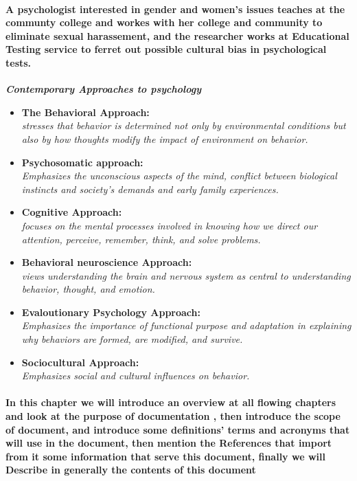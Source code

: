 \documentclass[../Psychological_system_web_application.tex]{subfiles}
\begin{document}
			\paragraph{A \gls{psychologist} interested in gender and women's issues teaches at the communty college and workes with her college and community to eliminate sexual harassement, and the researcher works at Educational Testing service to ferret out possible cultural bias in psychological tests.}
			
			\textsl{\textbf{Contemporary Approaches to \gls{psychology}}}
				\begin{itemize}
					\item
						\textsf{\textbf{\color{red} The Behavioral Approach:}}\\
							\emph{stresses that behavior is determined not only by environmental conditions but also by how thoughts modify the impact of environment on behavior.}
					\item
						\textsf{\textbf{\color{red} Psychosomatic approach:}}\\
							\emph{Emphasizes the unconscious aspects of the mind, conflict between biological instincts and society's demands and early family experiences.}
					\item
						\textsf{\textbf{\color{red} Cognitive Approach:}}\\
							\emph{focuses on the \gls{mental processes} involved in knowing how we direct our attention, perceive, remember, think, and solve problems.}
					\item
						\textsf{\textbf{\color{red}Behavioral neuroscience Approach:}}\\
							\emph{views understanding the brain and nervous system as central to understanding behavior, thought, and emotion.}
					\item
						\textsf{\textbf{\color{red} Evaloutionary Psychology Approach:}}\\
							\emph{Emphasizes the importance of functional purpose and adaptation in explaining why behaviors are formed, are modified, and survive.}
					\item
						\textsf{\textbf{\color{red} Sociocultural Approach:}}\\
							\emph{Emphasizes social and cultural influences on behavior.}
				\end{itemize}			
			
		\paragraph{  In this chapter we will introduce an overview at all flowing chapters and look at the purpose of documentation , then introduce the scope of document, and introduce some definitions' terms and acronyms that will use in the document, then mention the References that import from it some information that serve this document, finally we will Describe in generally the contents of this document}
		
\end{document}
